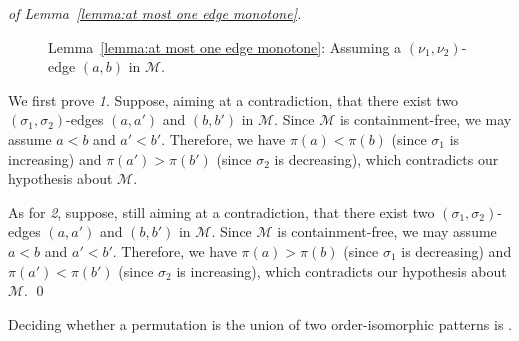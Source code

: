 \documentclass[a4paper]{llncs}
\begin{document}
\begin{proof}[of Lemma~\ref{lemma:at most one edge monotone}]
\begin{figure}[t!]
{
      \label{subfig:decresing before and below increasing}
    }%
    \caption{\label{fig:subfig:no (nu_1, nu_2)-edge}%
      Lemma~\ref{lemma:at most one edge monotone}:
      Assuming a $(\nu_1,\nu_2)$-edge $(a, b)$ in $\mathcal{M}$.
    }
  \end{figure}
  We first prove \emph{1}.
  Suppose, aiming at a contradiction, that there exist two
  $(\sigma_1, \sigma_2)$-edges $(a, a')$ and $(b, b')$ in $\mathcal{M}$.
  Since $\mathcal{M}$ is containment-free, we may assume $a < b$ and $a' < b'$.
  Therefore, we have
  $\pi(a) < \pi(b)$ (since $\sigma_1$ is increasing) and
  $\pi(a') > \pi(b')$ (since $\sigma_2$ is decreasing),
  which contradicts our hypothesis about $\mathcal{M}$.

  As for \emph{2}, suppose, still aiming at a contradiction,
  that there exist two
  $(\sigma_1, \sigma_2)$-edges $(a, a')$ and $(b, b')$ in $\mathcal{M}$.
  Since $\mathcal{M}$ is containment-free, we may assume $a < b$ and $a' < b'$.
  Therefore, we have
  $\pi(a) > \pi(b)$ (since $\sigma_1$ is decreasing) and
  $\pi(a') < \pi(b')$ (since $\sigma_2$ is increasing),
  which contradicts our hypothesis about $\mathcal{M}$.
  \qed
\end{proof}

\begin{proposition}
  \label{proposition:hardness}
  Deciding whether a permutation is the union of two
  order-isomorphic patterns is \NPC.
\end{proposition}
\end{document}
